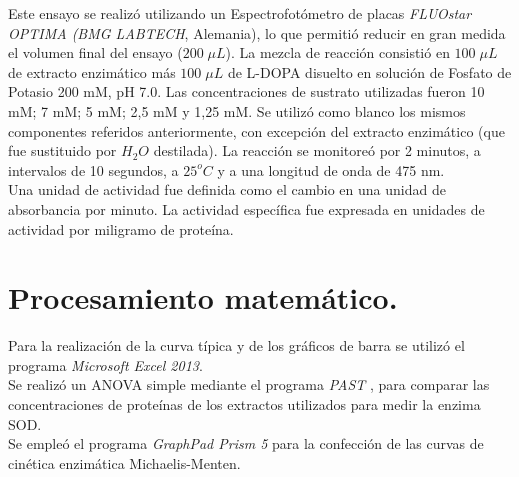Este ensayo se realizó utilizando un Espectrofotómetro de placas \textit{FLUOstar OPTIMA (BMG LABTECH}, Alemania), lo que permitió reducir en gran medida el volumen final del ensayo ($200\;\mu L$). La mezcla de reacción consistió en $100\;\mu L$ de extracto enzimático más $100\;\mu L$ de L-DOPA disuelto en solución de Fosfato de Potasio 200 mM, pH 7.0. Las concentraciones de sustrato utilizadas fueron 10 mM; 7 mM; 5 mM; 2,5 mM y 1,25 mM. Se utilizó como blanco los mismos componentes referidos anteriormente, con excepción del extracto enzimático (que fue sustituido por $H_2O$ destilada). La reacción se monitoreó por 2 minutos, a intervalos de 10 segundos, a $25^oC$ y a una longitud de onda de 475 nm. \\

Una  unidad de actividad fue definida como el cambio en una unidad de absorbancia por minuto. La actividad específica fue expresada en unidades de actividad por miligramo de proteína.

\section{Procesamiento matem\'atico.}

Para la realizaci\'on de la curva t\'ipica y de los gr\'aficos de barra se utiliz\'o el programa \textit{Microsoft Excel 2013}. \\

Se realiz\'o un ANOVA simple mediante el programa \textit{PAST} \citep{hammer2001past}, para comparar las concentraciones de prote\'inas de los extractos utilizados para medir la enzima SOD. \\

Se emple\'o el programa \textit{GraphPad Prism 5} \citep{motulsky2007prism} para la confecci\'on de las curvas de cin\'etica enzim\'atica Michaelis-Menten.

